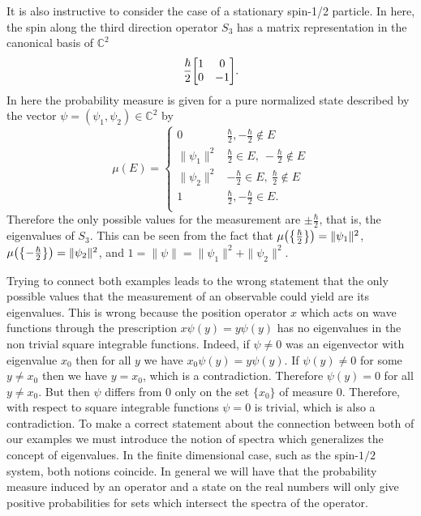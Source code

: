 \documentclass{article}
\begin{document}
It is also instructive to consider the case of a stationary spin-1/2 particle. In here, the spin along the third direction operator $S_3$ has a matrix representation in the canonical basis of $\mathbb{C}^2$
\begin{equation}
\frac{\hbar}{2}\mqty[1 & 0 \\ 0 & -1].
\end{equation}
In here the probability measure is given for a pure normalized state described by the vector $\psi=(\psi_1,\psi_2)\in\mathbb{C}^2$ by
\begin{equation}\label{eq:spin_probability_measure}
\mu(E)=\begin{cases}
0 & \frac{\hbar}{2},-\frac{\hbar}{2}\not\in E\\
\|\psi_1\|^2 & \frac{\hbar}{2}\in E, ~ -\frac{\hbar}{2}\not\in E\\
\|\psi_2\|^2 & -\frac{\hbar}{2}\in E, ~ \frac{\hbar}{2}\not\in E\\
1 & \frac{\hbar}{2},-\frac{\hbar}{2}\in E.\\
\end{cases}
\end{equation} 
Therefore the only possible values for the measurement are $\pm\frac{\hbar}{2}$, that is, the eigenvalues of $S_3$. This can be seen from the fact that $\mu\qty(\qty{\frac{\hbar}{2}})=\|\psi_1\|^2$, $\mu\qty(\qty{-\frac{\hbar}{2}})=\|\psi_2\|^2$, and $1=\|\psi\|=\|\psi_1\|^2+\|\psi_2\|^2$.

Trying to connect both examples leads to the wrong statement that the only possible values that the measurement of an observable could yield are its eigenvalues. This is wrong because the position operator $x$ which acts on wave functions through the prescription $x\psi(y)=y\psi(y)$ has no eigenvalues in the non trivial square integrable functions. Indeed, if $\psi\neq 0$ was an eigenvector with eigenvalue $x_0$ then for all $y$ we have $x_0\psi(y)=y\psi(y)$. If $\psi(y)\neq 0 $ for some $y\neq x_0$ then we have $y=x_0$, which is a contradiction. Therefore $\psi(y)=0$ for all $y\neq x_0$. But then $\psi$ differs from $0$ only on the set $\{x_0\}$ of measure $0$. Therefore, with respect to square integrable functions $\psi=0$ is trivial, which is also a contradiction. To make a correct statement about the connection between both of our examples we must introduce the notion of spectra which generalizes the concept of eigenvalues. In the finite dimensional case, such as the spin-$1/2$ system, both notions coincide. In general we will have that the probability measure induced by an operator and a state on the real numbers will only give positive probabilities for sets which intersect the spectra of the operator.
\end{document}

